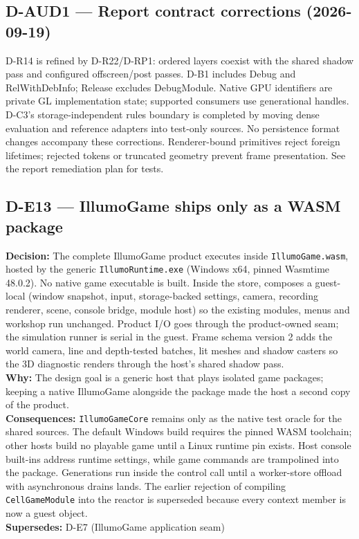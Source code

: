 \subsection*{D-AUD1 --- Report contract corrections (2026-09-19)}
D-R14 is refined by D-R22/D-RP1: ordered layers coexist with the shared shadow
pass and configured offscreen/post passes. D-B1 includes Debug and RelWithDebInfo;
Release excludes DebugModule. Native GPU identifiers are private GL implementation
state; supported consumers use generational handles. D-C3's storage-independent
rules boundary is completed by moving dense evaluation and reference adapters
into test-only sources. No persistence format changes accompany these corrections.
Renderer-bound primitives reject foreign lifetimes; rejected tokens or truncated
geometry prevent frame presentation. See the report remediation plan for tests.

\subsection*{D-E13 --- IllumoGame ships only as a WASM package}
\begin{decisionbox}[title={D-E13 \quad 2026-09-22}]
\textbf{Decision:} The complete IllumoGame product executes inside
\texttt{IllumoGame.wasm}, hosted by the generic \texttt{IllumoRuntime.exe}
(Windows x64, pinned Wasmtime 48.0.2). No native game executable is built.
Inside the store,  composes a guest-local
 (window snapshot, input, storage-backed settings,
camera, recording renderer, scene, console bridge, module host) so the
existing modules, menus and workshop run unchanged. Product I/O goes through
the product-owned  seam; the simulation runner is
serial in the guest. Frame schema version 2 adds the world camera, line and
depth-tested batches, lit meshes and shadow casters so the 3D diagnostic
renders through the host's shared shadow pass.\\
\textbf{Why:} The design goal is a generic host that plays isolated game
packages; keeping a native IllumoGame alongside the package made the host a
second copy of the product.\\
\textbf{Consequences:} \texttt{IllumoGameCore} remains only as the native test
oracle for the shared sources. The default Windows build requires the pinned
WASM toolchain; other hosts build no playable game until a Linux runtime pin
exists. Host console built-ins address runtime settings, while game commands
are trampolined into the package. Generations run inside the control call
until a worker-store offload with asynchronous drains lands. The earlier
rejection of compiling \texttt{CellGameModule} into the reactor is superseded
because every context member is now a guest object.\\
\textbf{Supersedes:} D-E7 (IllumoGame application seam)
\end{decisionbox}

